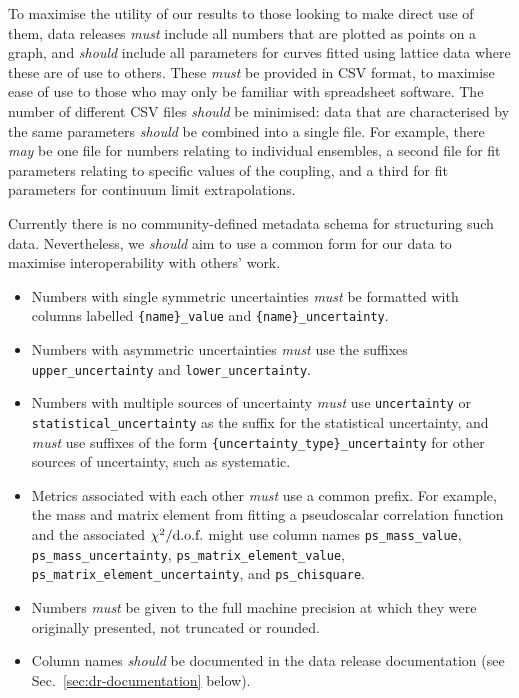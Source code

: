 \documentclass{article}
\newcommand\rfcword[1]{\emph{#1}\xspace}
\newcommand\must{\rfcword{must}}
\newcommand\should{\rfcword{should}}
\newcommand\may{\rfcword{may}}
\begin{document}
To maximise the utility of our results to those looking to make direct use of them,
data releases \must include all numbers that are plotted as points on a graph,
and \should include all parameters for curves fitted using lattice data
where these are of use to others.
These \must be provided in CSV format,
to maximise ease of use to those who may only be familiar with spreadsheet software.
The number of different CSV files \should be minimised:
data that are characterised by the same parameters
\should be combined into a single file.
For example,
there \may be one file for numbers relating to individual ensembles,
a second file for fit parameters relating to specific values of the coupling,
and a third for fit parameters for continuum limit extrapolations.

Currently there is no community-defined metadata schema for structuring such data.
Nevertheless,
we \should aim to use a common form for our data
to maximise interoperability with others' work.

\begin{itemize}
  \item
        Numbers with single symmetric uncertainties \must be formatted with columns labelled
        \verb|{name}_value| and \verb|{name}_uncertainty|.
  \item
        Numbers with asymmetric uncertainties \must use the suffixes
        \verb|upper_uncertainty| and \verb|lower_uncertainty|.
  \item
        Numbers with multiple sources of uncertainty \must use
        \verb|uncertainty| or \verb|statistical_uncertainty|
        as the suffix for the statistical uncertainty,
        and \must use suffixes of the form
        \verb|{uncertainty_type}_uncertainty|
        for other sources of uncertainty,
        such as systematic.
  \item
        Metrics associated with each other \must use a common prefix.
        For example,
        the mass and matrix element from fitting a pseudoscalar correlation function
        and the associated $\chi^{2}/\textnormal{d.o.f.}$
        might use column names
        \verb|ps_mass_value|,
        \verb|ps_mass_uncertainty|,
        \verb|ps_matrix_element_value|,
        \verb|ps_matrix_element_uncertainty|,
        and \verb|ps_chisquare|.
  \item
        Numbers \must be given to the full machine precision at which they were originally presented,
        not truncated or rounded.
  \item
        Column names \should be documented in the data release documentation
        (see Sec.~\ref{sec:dr-documentation} below).
\end{itemize}
\end{document}
